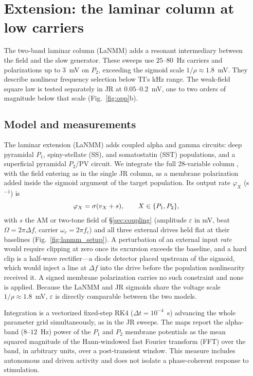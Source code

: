 \section{Extension: the laminar column at low carriers}\label{app:lanmm}
The two-band laminar column (LaNMM) adds a resonant intermediary
between the field and the slow generator. These sweeps use $25$--$80$~Hz carriers
and polarizations up to $3$~mV on $P_2$, exceeding the sigmoid scale
$1/\rho\approx1.8$~mV. They describe nonlinear frequency selection below TI's
kHz range. The weak-field square law is tested separately in JR at
$0.05$--$0.2$~mV, one to two orders of magnitude below that scale
(Fig.~\ref{fig:opp}b).

\subsection{Model and measurements}\label{sec:lanmm-methods}
The laminar extension (LaNMM) \cite{ruffini2025cfc,sanchezTodo2023} adds coupled alpha and gamma circuits: deep pyramidal $P_1$, spiny-stellate (SS), and somatostatin (SST) populations, and a superficial pyramidal $P_2$/PV circuit. We integrate the full 28-variable column \cite{ruffini2025cfc,sanchezTodo2023}, with the field entering as in the single JR column, as a membrane polarization added inside the sigmoid argument of the target population. Its output rate $\varphi_X$ (s$^{-1}$) is
\begin{equation}
\varphi_X=\sigma(v_X+s),\qquad X\in\{P_1,P_2\},
\label{eq:lanmm_drive}
\end{equation}
with $s$ the AM or two-tone field of \S\ref{sec:coupling} (amplitude $\varepsilon$ in
mV, beat $\Omega=2\pi\Delta f$, carrier $\omega_c=2\pi f_c$) and all three external drives
held flat at their baselines (Fig.~\ref{fig:lanmm_setup}). A perturbation of an external
input \emph{rate} would require clipping at zero
once its excursion exceeds the baseline, and a hard clip is a half-wave rectifier---a
diode detector placed upstream of the sigmoid, which would inject a line at $\Delta f$
into the drive before the population nonlinearity received it. A signed membrane
polarization carries no such constraint and none is applied. Because the LaNMM and JR
sigmoids share the voltage scale $1/\rho\approx1.8$~mV, $\varepsilon$ is directly
comparable between the two models.

Integration is a vectorized fixed-step RK4
($\Delta t=10^{-4}$~s) advancing the whole parameter grid simultaneously, as in the JR
sweeps. The maps report the
alpha-band ($8$--$12$~Hz) power of the $P_1$ and $P_2$ membrane potentials as the mean
squared magnitude of the Hann-windowed fast Fourier transform (FFT) over the band, in arbitrary units, over a
post-transient window. This measure includes autonomous and driven activity and
does not isolate a phase-coherent response to stimulation.

